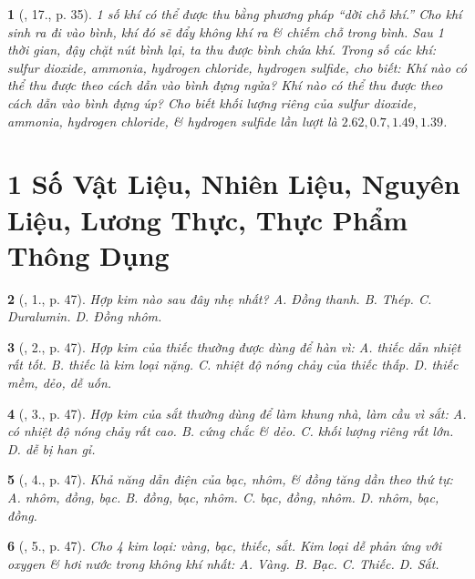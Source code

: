 \documentclass{article}
\newtheorem{baitoan}{}
\begin{document}
\begin{baitoan}[\cite{ncpt_KHTN_6_tap_1}, 17., p. 35]
	1 số khí có thể được thu bằng phương pháp ``dời chỗ khí.'' Cho khí sinh ra đi vào bình, khí đó sẽ đẩy không khí ra \& chiếm chỗ trong bình. Sau 1 thời gian, đậy chặt nút bình lại, ta thu được bình chứa khí. Trong số các khí: sulfur dioxide, ammonia, hydrogen chloride, hydrogen sulfide, cho biết: Khí nào có thể thu được theo cách dẫn vào bình đựng ngửa? Khí nào có thể thu được theo cách dẫn vào bình đựng úp? Cho biết khối lượng riêng của sulfur dioxide, ammonia, hydrogen chloride, \& hydrogen sulfide lần lượt là $2.62,0.7,1.49,1.39$.
\end{baitoan}


\section{1 Số Vật Liệu, Nhiên Liệu, Nguyên Liệu, Lương Thực, Thực Phẩm Thông Dụng}

\begin{baitoan}[\cite{ncpt_KHTN_6_tap_1}, 1., p. 47]
	Hợp kim nào sau đây nhẹ nhất? {\sf A.} Đồng thanh. {\sf B.} Thép. {\sf C.} Duralumin. {\sf D.} Đồng nhôm.
\end{baitoan}

\begin{baitoan}[\cite{ncpt_KHTN_6_tap_1}, 2., p. 47]
	Hợp kim của thiếc thường được dùng để hàn vì: {\sf A.} thiếc dẫn nhiệt rất tốt. {\sf B.} thiếc là kim loại nặng. {\sf C.} nhiệt độ nóng chảy của thiếc thấp. {\sf D.} thiếc mềm, dẻo, dễ uốn.
\end{baitoan}

\begin{baitoan}[\cite{ncpt_KHTN_6_tap_1}, 3., p. 47]
	Hợp kim của sắt thường dùng để làm khung nhà, làm cầu vì sắt: {\sf A.} có nhiệt độ nóng chảy rất cao. {\sf B.} cứng chắc \& dẻo. {\sf C.} khối lượng riêng rất lớn. {\sf D.} dễ bị han gỉ.
\end{baitoan}

\begin{baitoan}[\cite{ncpt_KHTN_6_tap_1}, 4., p. 47]
	Khả năng dẫn điện của bạc, nhôm, \& đồng tăng dần theo thứ tự: {\sf A.} nhôm, đồng, bạc. {\sf B.} đồng, bạc, nhôm. {\sf C.} bạc, đồng, nhôm. {\sf D.} nhôm, bạc, đồng.
\end{baitoan}

\begin{baitoan}[\cite{ncpt_KHTN_6_tap_1}, 5., p. 47]
	Cho 4 kim loại: vàng, bạc, thiếc, sắt. Kim loại dễ phản ứng với oxygen \& hơi nước trong không khí nhất: {\sf A.} Vàng. {\sf B.} Bạc. {\sf C.} Thiếc. {\sf D.} Sắt.
\end{baitoan}
\end{document}
